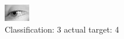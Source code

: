\begin{figure}[h!]
\begin{center}
\includegraphics[width=0.60\columnwidth]{figures/ID2960_class_3_target_4.png}
\end{center}
\caption{ Classification: 3 actual target: 4}
\label{fig:ID2960_class_3_target_4}
\end{figure}
